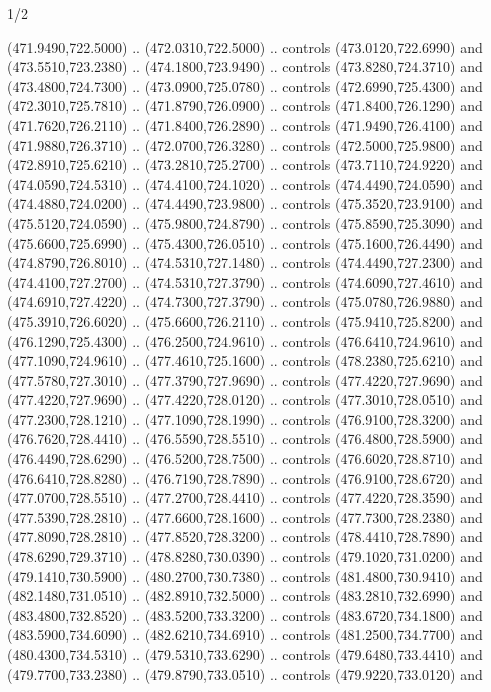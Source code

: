 \begin{flagdescription}{1/2}
\begin{scope}[xshift=0.5\flaglength]
\begin{scope}[scale=0.00745\flagwidth,xshift=-12.1mm,yshift=41.7mm]
\begin{scope}[y=0.80pt, x=0.80pt, yscale=-1, xscale=1, inner sep=0pt, outer sep=0pt]
\begin{scope}[cm={{1.33333,0.0,0.0,-1.33333,(0.0,114.66667)}}]
\begin{scope}[scale=0.100]
  (471.9490,722.5000) .. (472.0310,722.5000) .. controls (473.0120,722.6990) and
  (473.5510,723.2380) .. (474.1800,723.9490) .. controls (473.8280,724.3710) and
  (473.4800,724.7300) .. (473.0900,725.0780) .. controls (472.6990,725.4300) and
  (472.3010,725.7810) .. (471.8790,726.0900) .. controls (471.8400,726.1290) and
  (471.7620,726.2110) .. (471.8400,726.2890) .. controls (471.9490,726.4100) and
  (471.9880,726.3710) .. (472.0700,726.3280) .. controls (472.5000,725.9800) and
  (472.8910,725.6210) .. (473.2810,725.2700) .. controls (473.7110,724.9220) and
  (474.0590,724.5310) .. (474.4100,724.1020) .. controls (474.4490,724.0590) and
  (474.4880,724.0200) .. (474.4490,723.9800) .. controls (475.3520,723.9100) and
  (475.5120,724.0590) .. (475.9800,724.8790) .. controls (475.8590,725.3090) and
  (475.6600,725.6990) .. (475.4300,726.0510) .. controls (475.1600,726.4490) and
  (474.8790,726.8010) .. (474.5310,727.1480) .. controls (474.4490,727.2300) and
  (474.4100,727.2700) .. (474.5310,727.3790) .. controls (474.6090,727.4610) and
  (474.6910,727.4220) .. (474.7300,727.3790) .. controls (475.0780,726.9880) and
  (475.3910,726.6020) .. (475.6600,726.2110) .. controls (475.9410,725.8200) and
  (476.1290,725.4300) .. (476.2500,724.9610) .. controls (476.6410,724.9610) and
  (477.1090,724.9610) .. (477.4610,725.1600) .. controls (478.2380,725.6210) and
  (477.5780,727.3010) .. (477.3790,727.9690) .. controls (477.4220,727.9690) and
  (477.4220,727.9690) .. (477.4220,728.0120) .. controls (477.3010,728.0510) and
  (477.2300,728.1210) .. (477.1090,728.1990) .. controls (476.9100,728.3200) and
  (476.7620,728.4410) .. (476.5590,728.5510) .. controls (476.4800,728.5900) and
  (476.4490,728.6290) .. (476.5200,728.7500) .. controls (476.6020,728.8710) and
  (476.6410,728.8280) .. (476.7190,728.7890) .. controls (476.9100,728.6720) and
  (477.0700,728.5510) .. (477.2700,728.4410) .. controls (477.4220,728.3590) and
  (477.5390,728.2810) .. (477.6600,728.1600) .. controls (477.7300,728.2380) and
  (477.8090,728.2810) .. (477.8520,728.3200) .. controls (478.4410,728.7890) and
  (478.6290,729.3710) .. (478.8280,730.0390) .. controls (479.1020,731.0200) and
  (479.1410,730.5900) .. (480.2700,730.7380) .. controls (481.4800,730.9410) and
  (482.1480,731.0510) .. (482.8910,732.5000) .. controls (483.2810,732.6990) and
  (483.4800,732.8520) .. (483.5200,733.3200) .. controls (483.6720,734.1800) and
  (483.5900,734.6090) .. (482.6210,734.6910) .. controls (481.2500,734.7700) and
  (480.4300,734.5310) .. (479.5310,733.6290) .. controls (479.6480,733.4410) and
  (479.7700,733.2380) .. (479.8790,733.0510) .. controls (479.9220,733.0120) and

\end{scope}
\end{scope}
\end{scope}
\end{scope}
\end{scope}
\end{flagdescription}
